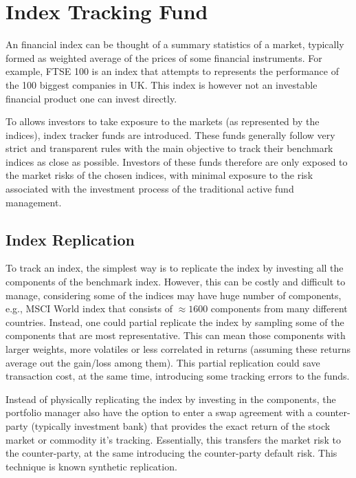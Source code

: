 \section{Index Tracking Fund}
An financial index can be thought of a summary statistics of a market, typically formed as weighted average of the prices of some financial instruments. For example, FTSE 100 is an index that attempts to represents the performance of the 100 biggest companies in UK. This index is however not an investable financial product one can invest directly.
 
To allows investors to take exposure to the markets (as represented by the indices), index tracker funds are introduced. These funds generally follow very strict and transparent rules with the main objective to track their benchmark indices as close as possible. Investors of these funds therefore are only exposed to the market risks of the chosen indices, with minimal exposure to the risk associated with the investment process of the traditional active fund management.
 
\subsection{Index Replication}
To track an index, the simplest way is to replicate the index by investing all the components of the benchmark index. However, this can be costly and difficult to manage, considering some of the indices may have huge number of components, e.g., MSCI World index that consists of $\approx 1600$ components from many different countries. Instead, one could partial replicate the index by sampling some of the components that are most representative. This can mean those components with larger weights, more volatiles or less correlated in returns (assuming these returns average out the gain/loss among them). This partial replication could save transaction cost, at the same time, introducing some tracking errors to the funds.
 
Instead of physically replicating the index by investing in the components, the portfolio manager also have the option to enter a swap agreement with a counter-party (typically investment bank) that provides the exact return of the stock market or commodity it's tracking. Essentially, this transfers the market risk to the counter-party, at the same introducing the counter-party default risk. This technique is known synthetic replication.
 
